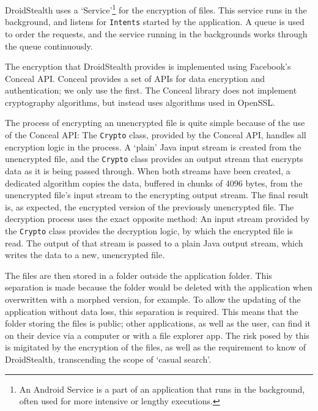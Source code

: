DroidStealth uses a `Service'\footnote{An Android Service is a part of an application that runs in the background, often used for more intensive or lengthy executions.} for the encryption of files.
This service runs in the background, and listens for \texttt{Intents} started by the application.
A queue is used to order the requests, and the service running in the backgrounds works through the queue continuously.

The encryption that DroidStealth provides is implemented using Facebook's Conceal API\cite{facebookConceal}.
Conceal provides a set of APIs for data encryption and authentication; we only use the first.
The Conceal library does not implement cryptography algorithms, but instead uses algorithms used in OpenSSL\cite{openssl}.

The process of encrypting an unencrypted file is quite simple because of the use of the Conceal API:
The \texttt{Crypto} class, provided by the Conceal API, handles all encryption logic in the process.
A `plain' Java input stream is created from the unencrypted file, and the \texttt{Crypto} class provides an output stream that encrypts data as it is being passed through.
When both streams have been created, a dedicated algorithm copies the data, buffered in chunks of 4096 bytes, from the unencrypted file's input stream to the encrypting output stream.
The final result is, as expected, the encrypted version of the previously unencrypted file.
The decryption process uses the exact opposite method:
An input stream provided by the \texttt{Crypto} class provides the decryption logic, by which the encrypted file is read.
The output of that stream is passed to a plain Java output stream, which writes the data to a new, unencrypted file.

The files are then stored in a folder outside the application folder.
This separation is made because the folder would be deleted with the application when overwritten with a morphed version, for example.
To allow the updating of the application without data loss, this separation is required.
This means that the folder storing the files is public; other applications, as well as the user, can find it on their device via a computer or with a file explorer app.
The risk posed by this is migitated by the encryption of the files, as well as the requirement to know of DroidStealth, transcending the scope of `casual search'.
